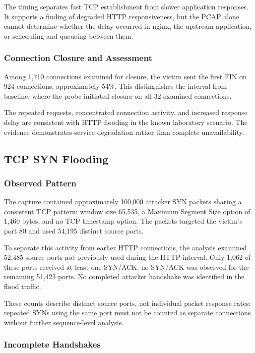 The timing separates fast TCP establishment from slower application responses. It supports a finding of degraded HTTP responsiveness, but the PCAP alone cannot determine whether the delay occurred in nginx, the upstream application, or scheduling and queueing between them.

\subsubsection{Connection Closure and Assessment}

Among 1,710 connections examined for closure, the victim sent the first FIN on 924 connections, approximately 54\%. This distinguishes the interval from baseline, where the probe initiated closure on all 32 examined connections.

The repeated requests, concentrated connection activity, and increased response delay are consistent with HTTP flooding in the known laboratory scenario. The evidence demonstrates service degradation rather than complete unavailability.

\subsection{TCP SYN Flooding}
\label{sec:syn-flood}

\subsubsection{Observed Pattern}

The capture contained approximately 100,000 attacker SYN packets sharing a consistent TCP pattern: window size 65,535, a Maximum Segment Size option of 1,460 bytes, and no TCP timestamp option. The packets targeted the victim's port 80 and used 54,195 distinct source ports.

To separate this activity from earlier HTTP connections, the analysis examined 52,485 source ports not previously used during the HTTP interval. Only 1,062 of these ports received at least one SYN/ACK; no SYN/ACK was observed for the remaining 51,423 ports. No completed attacker handshake was identified in the flood traffic.

These counts describe distinct source ports, not individual packet response rates: repeated SYNs using the same port must not be counted as separate connections without further sequence-level analysis.

\subsubsection{Incomplete Handshakes}

